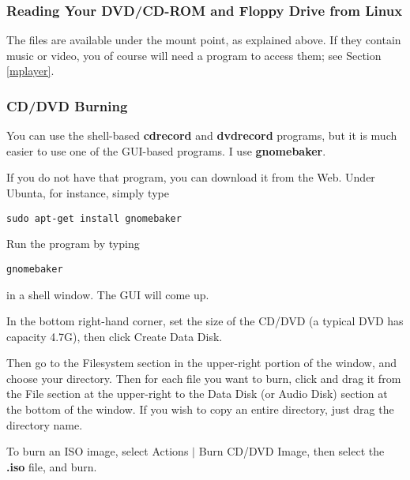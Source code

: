\documentclass[11pt]{article}
\begin{document}
\subsubsection{Reading Your DVD/CD-ROM and Floppy Drive from Linux}
\label{dvd}

The files are available under the mount point, as explained above.
If they contain music or video, you of course will need a program to
access them; see Section \ref{mplayer}.

\subsubsection{CD/DVD Burning}

You can use the shell-based {\bf cdrecord} and {\bf dvdrecord} programs,
but it is much easier to use one of the GUI-based programs.  I use {\bf
gnomebaker}.

If you do not have that program, you can download it from the Web.
Under Ubunta, for instance, simply type

\begin{Verbatim}[fontsize=\relsize{-2}]
sudo apt-get install gnomebaker
\end{Verbatim}

Run the program by typing

\begin{Verbatim}[fontsize=\relsize{-2}]
gnomebaker
\end{Verbatim}

in a shell window.  The GUI will come up.  

In the bottom right-hand corner, set the size of the CD/DVD (a typical
DVD has capacity 4.7G), then click Create Data Disk.

Then go to the Filesystem section in the upper-right portion of the
window, and choose your directory.  Then for each file you want to burn,
click and drag it from the File section at the upper-right to the Data
Disk (or Audio Disk) section at the bottom of the window.  If you wish
to copy an entire directory, just drag the directory name.

To burn an ISO image, select Actions $|$ Burn CD/DVD Image, then 
select the {\bf .iso} file, and burn.
\end{document}
